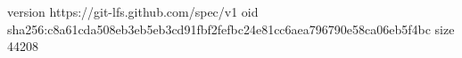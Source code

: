version https://git-lfs.github.com/spec/v1
oid sha256:c8a61cda508eb3eb5eb3cd91fbf2fefbc24e81cc6aea796790e58ca06eb5f4bc
size 44208
